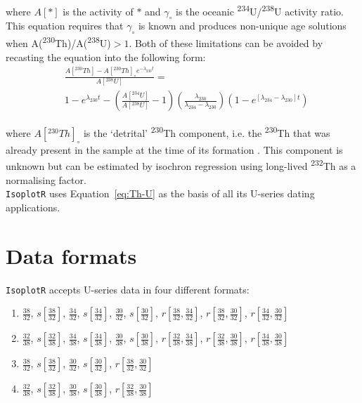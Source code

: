 \begin{refsection}
\noindent where $A[\ast]$ is the activity of $\ast$ and $\gamma_\circ$
is the oceanic \textsuperscript{234}U/\textsuperscript{238}U activity
ratio. This equation requires that $\gamma_\circ$ is known and
produces non-unique age solutions when
A(\textsuperscript{230}Th)/A(\textsuperscript{238}U)$>1$. Both of
these limitations can be avoided by recasting the equation into the
following form:
\begin{equation}
  \begin{split}
  & \frac{A[{}^{230}Th] - A[{}^{230}Th]_{\circ}e^{-\lambda_{230}t}}{A[{}^{238}U]} = \\
  & 1 - e^{\lambda_{230}t} -
  \left(\frac{A[{}^{234}U]}{A[{}^{238}U]}-1\right)
  \left(\frac{\lambda_{230}}{\lambda_{234}-\lambda_{230}}\right)
  \left(1-e^{[\lambda_{234}-\lambda_{230}]t}\right)
  \end{split}
  \label{eq:Th-U}
\end{equation}

\noindent where $A[{}^{230}Th]_\circ$ is the `detrital' \textsuperscript{230}Th
component, i.e. the \textsuperscript{230}Th that was already present
in the sample at the time of its formation \citep{kaufman1965,
  ludwig2003b}. This component is unknown but can be estimated by
isochron regression using long-lived \textsuperscript{232}Th as a
normalising factor.\\

\texttt{IsoplotR} uses Equation~\ref{eq:Th-U} as the basis of all its
U-series dating applications.

\section{Data formats}\label{sec:ThUformats}

\texttt{IsoplotR} accepts U-series data in four different formats:

\begin{enumerate}
\item $\frac{38}{32}$, $s\!\left[\frac{38}{32}\right]$,
  $\frac{34}{32}$, $s\!\left[\frac{34}{32}\right]$,
  $\frac{30}{32}$, $s\!\left[\frac{30}{32}\right]$,
  $r\!\left[\frac{38}{32},\frac{34}{32}\right]$,
  $r\!\left[\frac{38}{32},\frac{30}{32}\right]$,
  $r\!\left[\frac{34}{32},\frac{30}{32}\right]$
\item $\frac{32}{38}$, $s\!\left[\frac{32}{38}\right]$,
  $\frac{34}{38}$, $s\!\left[\frac{34}{38}\right]$,
  $\frac{30}{38}$, $s\!\left[\frac{30}{38}\right]$,
  $r\!\left[\frac{32}{38},\frac{34}{38}\right]$,
  $r\!\left[\frac{32}{38},\frac{30}{38}\right]$,
  $r\!\left[\frac{34}{38},\frac{30}{38}\right]$
\item $\frac{38}{32}$, $s\!\left[\frac{38}{32}\right]$,
  $\frac{30}{32}$, $s\!\left[\frac{30}{32}\right]$,
  $r\!\left[\frac{38}{32},\frac{30}{32}\right]$
\item $\frac{32}{38}$, $s\!\left[\frac{32}{38}\right]$,
  $\frac{30}{38}$, $s\!\left[\frac{30}{38}\right]$,
  $r\!\left[\frac{32}{38},\frac{30}{38}\right]$
\end{enumerate}


\end{refsection}
